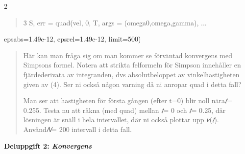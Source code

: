 \documentclass[
]{article}
\begin{document}
2

\begin{quote}
3 S, err = quad(vel, 0, T, args = (omega0,omega,gamma), ...
\end{quote}

epsabs=1.49e-12, epsrel=1.49e-12, limit=500)

\begin{quote}
Här kan man fråga sig om man kommer se förväntad konvergens med Simpsons
formel. Notera att strikta felformeln för Simpson innehåller en
fjärdederivata av integranden, dvs absolutbeloppet av vinkelhastigheten
given av (4). Ser ni också någon varning då ni anropar quad i detta
fall?

Man ser att hastigheten för första gången (efter t=0) blir noll
nära\emph{𝑡}= 0\emph{.}255. Testa nu att räkna (med quad) mellan
\emph{𝑡}= 0 och \emph{𝑡}= 0\emph{.}25, där lösningen är snäll i hela
intervallet, där ni också plottar upp
\textbar{}\emph{𝑣}(\emph{𝑡})\textbar. Använd\emph{𝑁}= 200 intervall i
detta fall.
\end{quote}

\textbf{Deluppgift 2: \emph{Konvergens}}
\end{document}
